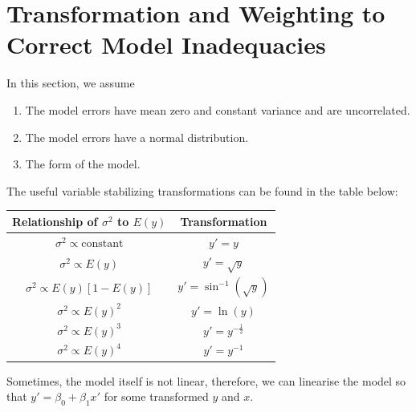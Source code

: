 \documentclass[11pt]{article}
\theoremstyle{definition}
\begin{document}
\section{Transformation and Weighting to Correct Model Inadequacies}
In this section, we assume
\begin{enumerate}
  \item The model errors have mean zero and constant variance and are uncorrelated.
  \item The model errors have a normal distribution.
  \item The form of the model.
\end{enumerate}
The useful variable stabilizing transformations can be found in the table below:
\begin{table}[h]
\centering
\begin{tabular}{|c|c|}
\hline
Relationship of $\sigma^2$ to $E(y)$ & Transformation\\\hline
$\sigma^2\propto \text{constant}$ & $y'=y$\\\hline
$\sigma^2\propto E(y)$ & $y'=\sqrt{y}$\\\hline
$\sigma^2\propto E(y)[1-E(y)]$ & $y'=\sin^{-1}(\sqrt{y})$\\\hline
$\sigma^2\propto E(y)^2$ & $y'=\ln(y)$\\\hline
$\sigma^2\propto E(y)^3$ & $y'=y^{-\frac{1}{2}}$\\\hline
$\sigma^2\propto E(y)^4$ & $y'=y^{-1}$\\\hline
\end{tabular}
\end{table}
Sometimes, the model itself is not linear, therefore, we can linearise the model so that $y'=\beta_0+\beta_1x'$ for some transformed $y$ and $x$.
\end{document}
